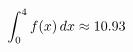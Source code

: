 \documentclass[preview]{standalone}
\begin{document}
\begin{align*}
\special{dvisvgm:raw <g id='unique000'>}\int_0^4 f(x)\,dx \approx 10.93\special{dvisvgm:raw </g>}
\end{align*}
\end{document}
